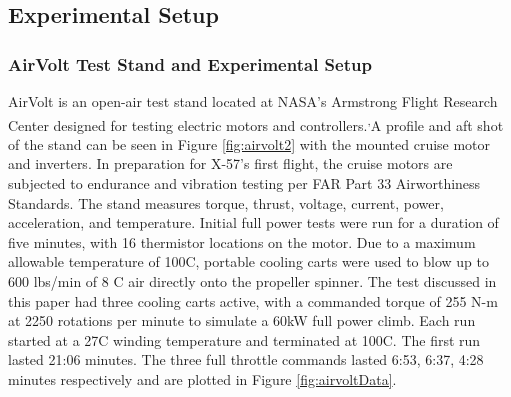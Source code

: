 \documentclass[]{aiaa-tc}%
\begin{document}

\subsection{Experimental Setup}
\subsubsection{AirVolt Test Stand and Experimental Setup}

AirVolt is an open-air test stand located at NASA's Armstrong Flight Research Center designed for testing electric motors and controllers.\cite{Aamod_2015}\textsuperscript{,}\cite{Papathakis}A profile and aft shot of the stand can be seen in Figure \ref{fig:airvolt2} with the mounted cruise motor and inverters. In preparation for X-57's first flight, the cruise motors are subjected to endurance and vibration testing per FAR Part 33 Airworthiness Standards. The stand measures torque, thrust, voltage, current, power, acceleration, and temperature. Initial full power tests were run for a duration of five minutes, with 16 thermistor locations on the motor. Due to a maximum allowable temperature of 100\degree C, portable cooling carts were used to blow up to 600 lbs/min of 8 \degree C air directly onto the propeller spinner.  The test discussed in this paper had three cooling carts active, with a commanded torque of 255 N-m at 2250 rotations per minute to simulate a 60kW full power climb. Each run started at a 27\degree C winding temperature and terminated at 100\degree C. The first run lasted 21:06 minutes. The three full throttle commands lasted 6:53, 6:37, 4:28 minutes respectively and are plotted in Figure \ref{fig:airvoltData}.
\end{document}
